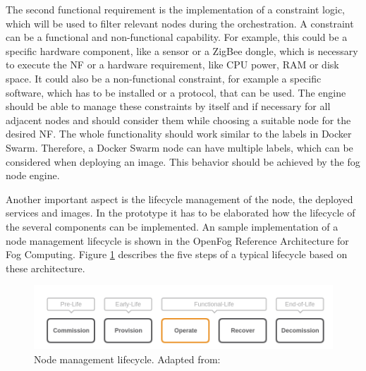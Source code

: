 The second functional requirement is the implementation of a constraint logic, which will be used to filter relevant nodes during the orchestration.
A constraint can be a functional and non-functional capability.
For example, this could be a specific hardware component, like a sensor or a ZigBee dongle, which is necessary to execute the \ac{NF} or a hardware requirement, like \ac{CPU} power, \ac{RAM} or disk space.
It could also be a non-functional constraint, for example a specific software, which has to be installed or a protocol, that can be used.
The engine should be able to manage these constraints by itself and if necessary for all adjacent nodes and should consider them while choosing a suitable node for the desired \ac{NF}.
The whole functionality should work similar to the labels in Docker Swarm.
Therefore, a Docker Swarm node can have multiple labels, which can be considered when deploying an image.
This behavior should be achieved by the fog node engine.

Another important aspect is the lifecycle management of the node, the deployed services and images.
In the prototype it has to be elaborated how the lifecycle of the several components can be implemented.
An sample implementation of a node management lifecycle is shown in the OpenFog Reference Architecture for Fog Computing\autocite[cf.][p. 52 f.]{OpenFog:2017}.
Figure \ref{fig:open_fog_node_mgm_lifecycle} describes the five steps of a typical lifecycle based on these architecture.
\begin{figure}[H]
    \centering
    \includegraphics[width=\textwidth]{resources/images/node_management_lifecycle.png}
    \caption[Node management lifecycle]{Node management lifecycle. Adapted from: \autocite[p. 52]{OpenFog:2017}}
    \label{fig:open_fog_node_mgm_lifecycle}
\end{figure}

